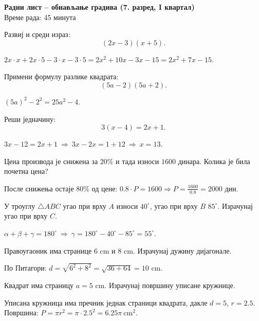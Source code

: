 \documentclass[11pt,a5paper,addpoints]{exam}
\begin{document}
\begin{center}
\Large \textbf{Радни лист – обнављање градива (7. разред, I квартал)} \\
\smallskip
\small Време рада: 45 минута
\end{center}

\begin{questions}

\question[3]
Развиј и среди израз:
\[
(2x-3)(x+5).
\]
\begin{solution}[\stretch{2}]
$2x\cdot x+2x\cdot 5-3\cdot x-3\cdot 5=2x^2+10x-3x-15=2x^2+7x-15$.
\end{solution}

\question[3]
Примени формулу разлике квадрата:
\[
(5a-2)(5a+2).
\]
\begin{solution}[\stretch{1}]
$(5a)^2-2^2=25a^2-4$.
\end{solution}

\question[4]
Реши једначину:
\[
3(x-4)=2x+1.
\]
\begin{solution}[\stretch{2}]
$3x-12=2x+1 \ \Rightarrow\ 3x-2x=1+12 \ \Rightarrow\ x=13$.
\end{solution}

\question[3]
Цена производа је снижена за $20\%$ и тада износи $1600$ динара. Колика је била почетна цена?
\begin{solution}[\stretch{2}]
После снижења остаје $80\%$ од цене: $0.8\cdot P=1600\Rightarrow P=\frac{1600}{0.8}=2000$ дин.
\end{solution}

\question[3]
У троуглу $\triangle ABC$ угао при врху $A$ износи $40^\circ$, угао при врху $B$ $85^\circ$. Израчунај угао при врху $C$.
\begin{solution}[\stretch{1}]
$\alpha+\beta+\gamma=180^\circ \ \Rightarrow \ \gamma=180^\circ-40^\circ-85^\circ=55^\circ$.
\end{solution}

\question[4]
Правоугаоник има странице $6$ cm и $8$ cm. Израчунај дужину дијагонале.
\begin{solution}[\stretch{2}]
По Питагори: $d=\sqrt{6^2+8^2}=\sqrt{36+64}=10$ cm.
\end{solution}

\question[4]
Квадрат има страницу $a=5$ cm. Израчунај површину уписане кружнице.
\begin{solution}[\stretch{2}]
Уписана кружница има пречник једнак страници квадрата, дакле $d=5$, $r=2.5$. Површина: $P=\pi r^2=\pi\cdot 2.5^2=6.25\pi\ \text{cm}^2$.
\end{solution}


\end{questions}
\end{document}
